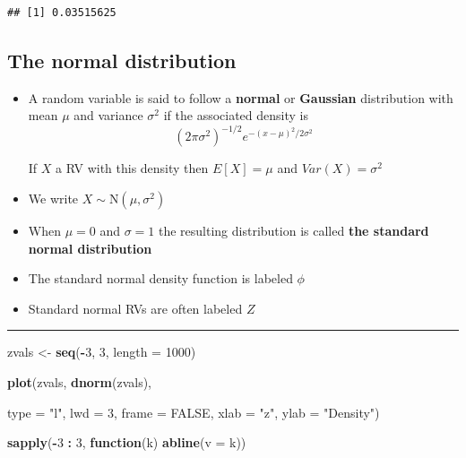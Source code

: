 \documentclass[]{article}
\newenvironment{Shaded}{\begin{snugshade}}{\end{snugshade}}
\newcommand{\ControlFlowTok}[1]{\textcolor[rgb]{0.13,0.29,0.53}{\textbf{#1}}}
\newcommand{\DataTypeTok}[1]{\textcolor[rgb]{0.13,0.29,0.53}{#1}}
\newcommand{\DecValTok}[1]{\textcolor[rgb]{0.00,0.00,0.81}{#1}}
\newcommand{\KeywordTok}[1]{\textcolor[rgb]{0.13,0.29,0.53}{\textbf{#1}}}
\newcommand{\NormalTok}[1]{#1}
\newcommand{\OperatorTok}[1]{\textcolor[rgb]{0.81,0.36,0.00}{\textbf{#1}}}
\newcommand{\OtherTok}[1]{\textcolor[rgb]{0.56,0.35,0.01}{#1}}
\newcommand{\StringTok}[1]{\textcolor[rgb]{0.31,0.60,0.02}{#1}}
\begin{document}
\begin{verbatim}
## [1] 0.03515625
\end{verbatim}

\hypertarget{the-normal-distribution}{%
\subsection{The normal distribution}\label{the-normal-distribution}}

\begin{itemize}
\item
  A random variable is said to follow a \textbf{normal} or
  \textbf{Gaussian} distribution with mean \(\mu\) and variance
  \(\sigma^2\) if the associated density is
  \[(2\pi \sigma^2)^{-1/2}e^{-(x - \mu)^2/2\sigma^2}\]

  If \(X\) a RV with this density then \(E[X] = \mu\) and
  \(Var(X) = \sigma^2\)
\item
  We write \(X\sim \mbox{N}(\mu, \sigma^2)\)
\item
  When \(\mu = 0\) and \(\sigma = 1\) the resulting distribution is
  called \textbf{the standard normal distribution}
\item
  The standard normal density function is labeled \(\phi\)
\item
  Standard normal RVs are often labeled \(Z\)
\end{itemize}

\begin{center}\rule{0.5\linewidth}{\linethickness}\end{center}

\begin{Shaded}
\begin{Highlighting}[]
\NormalTok{zvals <-}\StringTok{ }\KeywordTok{seq}\NormalTok{(}\OperatorTok{-}\DecValTok{3}\NormalTok{, }\DecValTok{3}\NormalTok{, }\DataTypeTok{length =} \DecValTok{1000}\NormalTok{)}

\KeywordTok{plot}\NormalTok{(zvals, }\KeywordTok{dnorm}\NormalTok{(zvals), }

     \DataTypeTok{type =} \StringTok{"l"}\NormalTok{, }\DataTypeTok{lwd =} \DecValTok{3}\NormalTok{, }\DataTypeTok{frame =} \OtherTok{FALSE}\NormalTok{, }\DataTypeTok{xlab =} \StringTok{"z"}\NormalTok{, }\DataTypeTok{ylab =} \StringTok{"Density"}\NormalTok{)}

\KeywordTok{sapply}\NormalTok{(}\OperatorTok{-}\DecValTok{3} \OperatorTok{:}\StringTok{ }\DecValTok{3}\NormalTok{, }\ControlFlowTok{function}\NormalTok{(k) }\KeywordTok{abline}\NormalTok{(}\DataTypeTok{v =}\NormalTok{ k))}
\end{Highlighting}
\end{Shaded}
\end{document}
